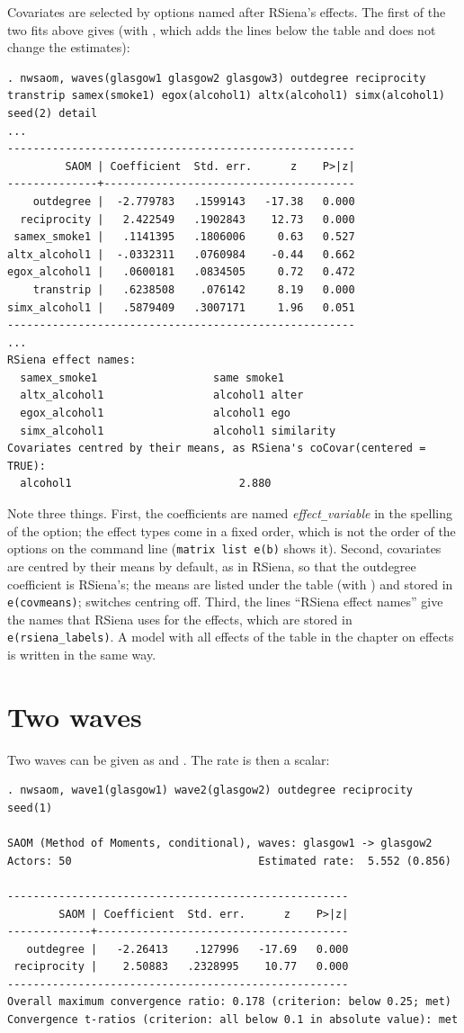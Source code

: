 Covariates are selected by options named after RSiena's effects. The first of the two fits above gives (with , which adds the lines below the table and does not change the estimates):
\begin{lstlisting}
. nwsaom, waves(glasgow1 glasgow2 glasgow3) outdegree reciprocity transtrip samex(smoke1) egox(alcohol1) altx(alcohol1) simx(alcohol1) seed(2) detail
...
------------------------------------------------------
         SAOM | Coefficient  Std. err.      z    P>|z|
--------------+---------------------------------------
    outdegree |  -2.779783   .1599143   -17.38   0.000
  reciprocity |   2.422549   .1902843    12.73   0.000
 samex_smoke1 |   .1141395   .1806006     0.63   0.527
altx_alcohol1 |  -.0332311   .0760984    -0.44   0.662
egox_alcohol1 |   .0600181   .0834505     0.72   0.472
    transtrip |   .6238508    .076142     8.19   0.000
simx_alcohol1 |   .5879409   .3007171     1.96   0.051
------------------------------------------------------
...
RSiena effect names:
  samex_smoke1                  same smoke1
  altx_alcohol1                 alcohol1 alter
  egox_alcohol1                 alcohol1 ego
  simx_alcohol1                 alcohol1 similarity
Covariates centred by their means, as RSiena's coCovar(centered = TRUE):
  alcohol1                          2.880
\end{lstlisting}
Note three things. First, the coefficients are named \emph{effect}\texttt{\_}\emph{variable} in the spelling of the option; the effect types come in a fixed order, which is not the order of the options on the command line (\texttt{matrix list e(b)} shows it). Second, covariates are centred by their means by default, as in RSiena, so that the outdegree coefficient is RSiena's; the means are listed under the table (with ) and stored in \texttt{e(covmeans)};  switches centring off. Third, the lines ``RSiena effect names'' give the names that RSiena uses for the effects, which are stored in \texttt{e(rsiena\_labels)}. A model with all effects of the table in the chapter on effects is written in the same way.

\section{Two waves}

Two waves can be given as  and . The rate is then a scalar:
\begin{lstlisting}
. nwsaom, wave1(glasgow1) wave2(glasgow2) outdegree reciprocity seed(1)

SAOM (Method of Moments, conditional), waves: glasgow1 -> glasgow2
Actors: 50                             Estimated rate:  5.552 (0.856)

-----------------------------------------------------
        SAOM | Coefficient  Std. err.      z    P>|z|
-------------+---------------------------------------
   outdegree |   -2.26413    .127996   -17.69   0.000
 reciprocity |    2.50883   .2328995    10.77   0.000
-----------------------------------------------------
Overall maximum convergence ratio: 0.178 (criterion: below 0.25; met)
Convergence t-ratios (criterion: all below 0.1 in absolute value): met
\end{lstlisting}


